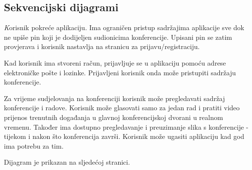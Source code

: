			\subsection{Sekvencijski dijagrami}
				
				
				\textit Korisnik pokreće aplikaciju. Ima ograničen pristup sadržajima aplikacije sve dok ne upiše pin koji je dodijeljen sudionicima konferencije. Upisani pin se zatim provjerava i korisnik nastavlja na stranicu za prijavu/registraciju.
				
				Kad korisnik ima stvoreni račun, prijavljuje se u aplikaciju pomoću adrese elektroničke pošte i lozinke. Prijavljeni korisnik onda može pristupiti sadržaju konferencije. 
				
				Za vrijeme sudjelovanja na konferenciji korisnik može pregledavati sadržaj konferencije i radove. Korisnik može glasovati samo za jedan rad i pratiti video prijenos trenutnih događanja u glavnoj konferencijskoj dvorani u realnom vremenu. Također ima dostupno pregledavanje i preuzimanje slika s konferencije - tijekom i nakon što konferencija završi. Korisnik može ugasiti aplikaciju kad god ima potrebu za tim.
				
				Dijagram je prikazan na sljedećoj stranici.
				\eject
				
